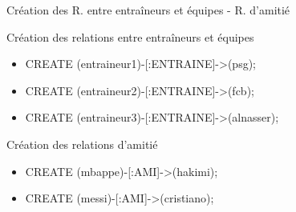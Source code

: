 \begin{frame}{Création des R. entre entraîneurs et équipes - R. d'amitié}
  \begin{block}{Création des relations entre entraîneurs et équipes}
    \begin{itemize}
      \item CREATE (entraineur1)-[:ENTRAINE]->(psg);
      \item CREATE (entraineur2)-[:ENTRAINE]->(fcb);
      \item CREATE (entraineur3)-[:ENTRAINE]->(alnasser);
    \end{itemize}
  \end{block}

  \begin{block}{Création des relations d'amitié}
    \begin{itemize}
      \item CREATE (mbappe)-[:AMI]->(hakimi);
      \item CREATE (messi)-[:AMI]->(cristiano);
    \end{itemize}
  \end{block}
\end{frame}